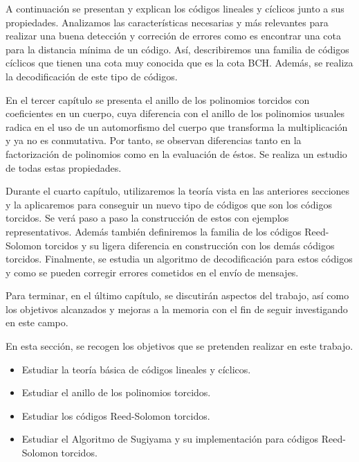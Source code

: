 A continuación se presentan y explican los códigos lineales y cíclicos junto a sus propiedades. Analizamos las características necesarias y más relevantes para realizar una buena detección y correción de errores como es encontrar una cota para la distancia mínima de un código. Así, describiremos una familia de códigos cíclicos que tienen una cota muy conocida que es la cota BCH. Además, se realiza la decodificación de este tipo de códigos.

En el tercer capítulo se presenta el anillo de los polinomios torcidos con coeficientes en un cuerpo, cuya diferencia con el anillo de los polinomios usuales radica en el uso de un automorfismo del cuerpo que transforma la multiplicación y ya no es conmutativa. Por tanto, se observan diferencias tanto en la factorización de polinomios como en la evaluación de éstos. Se realiza un estudio de todas estas propiedades.

Durante el cuarto capítulo, utilizaremos la teoría vista en las anteriores secciones y la aplicaremos para conseguir un nuevo tipo de códigos que son los códigos torcidos. Se verá paso a paso la construcción de estos con ejemplos representativos. Además también definiremos la familia de los códigos Reed-Solomon torcidos y su ligera diferencia en construcción con los demás códigos torcidos. Finalmente, se estudia un algoritmo de decodificación para estos códigos y como se pueden corregir errores cometidos en el envío de mensajes.

Para terminar, en el último capítulo, se discutirán aspectos del trabajo, así como los objetivos alcanzados y mejoras a la memoria con el fin de seguir investigando en este campo. 





En esta sección, se recogen los objetivos que se pretenden realizar en este trabajo.

\begin{itemize}
    \item Estudiar la teoría básica de códigos lineales y cíclicos.
    \item Estudiar el anillo de los polinomios torcidos.
    \item Estudiar los códigos Reed-Solomon torcidos.
    \item Estudiar el Algoritmo de Sugiyama y su implementación para códigos Reed-Solomon torcidos.    
\end{itemize}

